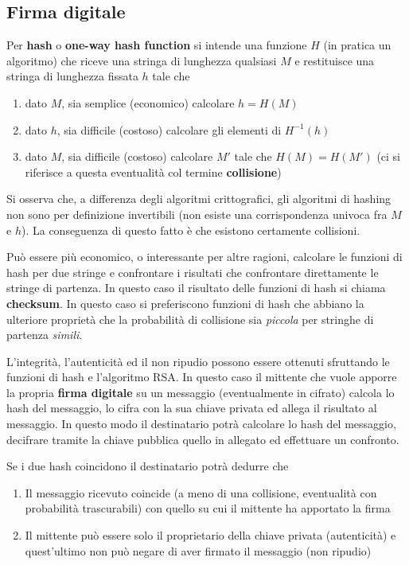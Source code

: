\documentclass[italian,]{article}
\providecommand{\tightlist}{%
  \setlength{\itemsep}{0pt}\setlength{\parskip}{0pt}}
\begin{document}
\subsection{Firma digitale}\label{firma-digitale}

Per \textbf{hash} o \textbf{one-way hash function} si intende una
funzione \(H\) (in pratica un algoritmo) che riceve una stringa di
lunghezza qualsiasi \(M\) e restituisce una stringa di lunghezza fissata
\(h\) tale che

\begin{enumerate}
\def\labelenumi{\arabic{enumi}.}
\tightlist
\item
  dato \(M\), sia semplice (economico) calcolare \(h = H(M)\)
\item
  dato \(h\), sia difficile (costoso) calcolare gli elementi di
  \(H^{-1}(h)\)
\item
  dato \(M\), sia difficile (costoso) calcolare \(M'\) tale che
  \(H(M) = H(M')\) (ci si riferisce a questa eventualità col termine
  \textbf{collisione})
\end{enumerate}

Si osserva che, a differenza degli algoritmi crittografici, gli
algoritmi di hashing non sono per definizione invertibili (non esiste
una corrispondenza univoca fra \(M\) e \(h\)). La conseguenza di questo
fatto è che esistono certamente collisioni.

Può essere più economico, o interessante per altre ragioni, calcolare le
funzioni di hash per due stringe e confrontare i risultati che
confrontare direttamente le stringe di partenza. In questo caso il
risultato delle funzioni di hash si chiama \textbf{checksum}. In questo
caso si preferiscono funzioni di hash che abbiano la ulteriore proprietà
che la probabilità di collisione sia \emph{piccola} per stringhe di
partenza \emph{simili}.

L'integrità, l'autenticità ed il non ripudio possono essere ottenuti
sfruttando le funzioni di hash e l'algoritmo RSA. In questo caso il
mittente che vuole apporre la propria \textbf{firma digitale} su un
messaggio (eventualmente in cifrato) calcola lo hash del messaggio, lo
cifra con la sua chiave privata ed allega il risultato al messaggio. In
questo modo il destinatario potrà calcolare lo hash del messaggio,
decifrare tramite la chiave pubblica quello in allegato ed effettuare un
confronto.

Se i due hash coincidono il destinatario potrà dedurre che

\begin{enumerate}
\def\labelenumi{\arabic{enumi}.}
\tightlist
\item
  Il messaggio ricevuto coincide (a meno di una collisione, eventualità
  con probabilità trascurabili) con quello su cui il mittente ha
  apportato la firma
\item
  Il mittente può essere solo il proprietario della chiave privata
  (autenticità) e quest'ultimo non può negare di aver firmato il
  messaggio (non ripudio)
\end{enumerate}
\end{document}
